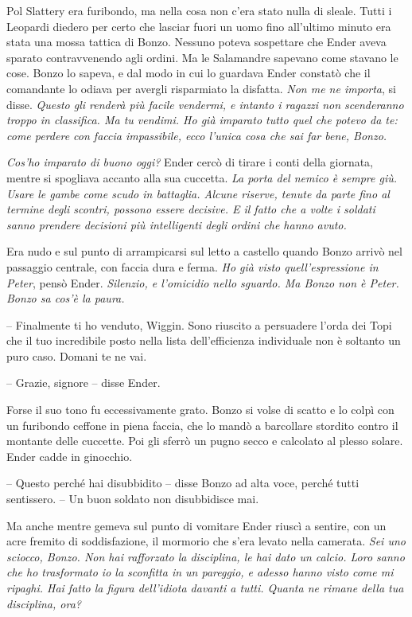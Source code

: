 {Pol Slattery era furibondo, ma nella cosa non c'era stato nulla di
	sleale. Tutti i Leopardi diedero per certo che lasciar fuori un uomo
	fino all'ultimo minuto era stata una mossa tattica di Bonzo. Nessuno
	poteva sospettare che Ender aveva sparato contravvenendo agli ordini. Ma
	le Salamandre sapevano come stavano le cose. Bonzo lo sapeva, e dal modo
	in cui lo guardava Ender constatò che il comandante lo odiava per
	avergli risparmiato la disfatta. \emph{Non me ne importa}, \emph{} si
	disse. \emph{Questo gli renderà più facile vendermi, e intanto i ragazzi
		non scenderanno troppo in classifica. Ma tu vendimi. Ho già imparato
		tutto quel che potevo da te: come perdere con faccia impassibile, ecco
		l'unica cosa che sai far bene, Bonzo.}}

\emph{{Cos'ho imparato di buono oggi? }}{Ender cercò di tirare i conti
	della giornata, mentre si spogliava accanto alla sua cuccetta. \emph{La
		porta del nemico è sempre giù. Usare le gambe come scudo in battaglia.
		Alcune riserve, tenute da parte fino al termine degli scontri, possono
		essere decisive. E il fatto che a volte i soldati sanno prendere
		decisioni più intelligenti degli ordini che hanno avuto.}}

{Era nudo e sul punto di arrampicarsi sul letto a castello quando Bonzo
	arrivò nel passaggio centrale, con faccia dura e ferma. \emph{Ho già
		visto quell'espressione in Peter}, \emph{} pensò Ender. \emph{Silenzio,
		e l'omicidio nello sguardo. Ma Bonzo non è Peter. Bonzo sa cos'è la
		paura.}}

{-- Finalmente ti ho venduto, Wiggin. Sono riuscito a persuadere l'orda
	dei Topi che il tuo incredibile posto nella lista dell'efficienza
	individuale non è soltanto un puro caso. Domani te ne vai.}

{-- Grazie, signore -- disse Ender.}

{Forse il suo tono fu eccessivamente grato. Bonzo si volse di scatto e
	lo colpì con un furibondo ceffone in piena faccia, che lo mandò a
	barcollare stordito contro il montante delle cuccette. Poi gli sferrò un
	pugno secco e calcolato al plesso solare. Ender cadde in ginocchio.}

{-- Questo perché hai disubbidito -- disse Bonzo ad alta voce, perché
	tutti sentissero. -- Un buon soldato non disubbidisce mai.}

{Ma anche mentre gemeva sul punto di vomitare Ender riuscì a sentire,
	con un acre fremito di soddisfazione, il mormorio che s'era levato nella
	camerata. \emph{Sei uno sciocco, Bonzo. Non hai rafforzato la
		disciplina, le hai dato un calcio. Loro sanno che ho trasformato io la
		sconfitta in un pareggio, e adesso hanno visto come mi ripaghi. Hai
		fatto la figura dell'idiota davanti a tutti. Quanta ne rimane della tua
		disciplina, ora?}}

